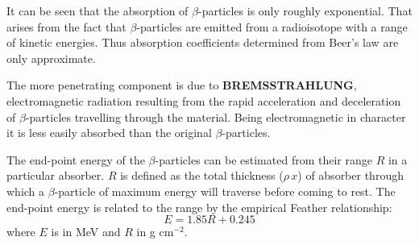 It can be seen that the absorption of $\beta$-particles is only roughly exponential. That arises from the fact that $\beta$-particles are emitted from a radioisotope with a range of kinetic energies. Thus absorption coefficients determined from Beer's law are only approximate.

The more penetrating component is due to \textbf{BREMSSTRAHLUNG}, electromagnetic radiation resulting from the rapid acceleration and deceleration of $\beta$-particles travelling through the material. Being electromagnetic in character it is less easily absorbed than the original $\beta$-particles.

The end-point energy of the $\beta$-particles can be estimated from their range $R$ in a particular absorber. $R$ is defined as the total thickness ($\rho \, x$) of absorber through which a $\beta$-particle of maximum energy will traverse before coming to rest. The end-point energy is related to the range by the empirical Feather relationship:
\begin{displaymath}
E = 1.85R + 0.245
\end{displaymath}
where $E$ is in MeV and $R$ in g cm$^{-2}$.